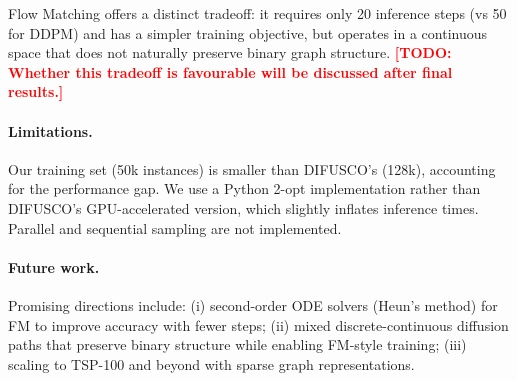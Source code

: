\documentclass[11pt,a4paper]{article}
\newcommand{\TODO}[1]{\textcolor{red}{\textbf{[TODO: #1]}}}
\begin{document}
Flow Matching offers a distinct tradeoff: it requires only 20 inference steps (vs 50 for
DDPM) and has a simpler training objective, but operates in a continuous space that does
not naturally preserve binary graph structure. \TODO{Whether this tradeoff is favourable
will be discussed after final results.}

\paragraph{Limitations.}
Our training set (50k instances) is smaller than DIFUSCO's (128k), accounting for
the performance gap. We use a Python 2-opt implementation rather than DIFUSCO's GPU-accelerated
version, which slightly inflates inference times. Parallel and sequential sampling are not implemented.

\paragraph{Future work.}
Promising directions include: (i) second-order ODE solvers (Heun's method) for FM to
improve accuracy with fewer steps; (ii) mixed discrete-continuous diffusion paths that
preserve binary structure while enabling FM-style training; (iii) scaling to TSP-100 and
beyond with sparse graph representations.
\end{document}
